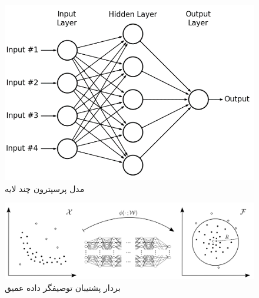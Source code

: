 \documentclass[12pt,a4paper]{report}
\theoremstyle{definition}
\theoremstyle{definition}
\begin{document}
\begin{figure}[!h]
	\begin{center}
		\includegraphics[width=0.5\linewidth]{./images/figures/mlp.png}
	\end{center}
	\caption{مدل پرسپترون چند لایه}
	\label{fig:mlp}
	\centering
\end{figure}

\begin{figure}[!h]
	\begin{center}
		\includegraphics[width=\linewidth]{./images/figures/deep-svdd.png}
	\end{center}
	\caption{بردار پشتیبان توصیفگر داده عمیق~\cite{pmlr-v80-ruff18a}}
	\label{fig:deep-svdd}
	\centering
\end{figure}
\end{document}
